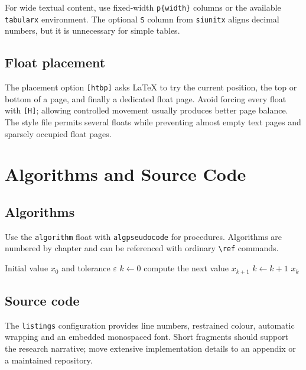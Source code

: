 \documentclass[oneside,header=auto]{liverpoolthesis}
\begin{document}
For wide textual content, use fixed-width \texttt{p\{width\}} columns or the available \texttt{tabularx} environment. The optional \texttt{S} column from \texttt{siunitx} aligns decimal numbers, but it is unnecessary for simple tables.

\section{Float placement}

The placement option \texttt{[htbp]} asks LaTeX to try the current position, the top or bottom of a page, and finally a dedicated float page. Avoid forcing every float with \texttt{[H]}; allowing controlled movement usually produces better page balance. The style file permits several floats while preventing almost empty text pages and sparsely occupied float pages.

\chapter{Algorithms and Source Code}

\section{Algorithms}

Use the \texttt{algorithm} float with \texttt{algpseudocode} for procedures. Algorithms are numbered by chapter and can be referenced with ordinary \verb|\ref| commands.

\begin{algorithm}[htbp]
  \caption{Example iterative procedure}\label{alg:example}
  \begin{algorithmic}[1]
    \Require Initial value $x_0$ and tolerance $\varepsilon$
    \State $k \gets 0$
      \State compute the next value $x_{k+1}$
      \State $k \gets k+1$
    \EndWhile
    \State \Return $x_k$
  \end{algorithmic}
\end{algorithm}

\section{Source code}

The \texttt{listings} configuration provides line numbers, restrained colour, automatic wrapping and an embedded monospaced font. Short fragments should support the research narrative; move extensive implementation details to an appendix or a maintained repository.
\end{document}
